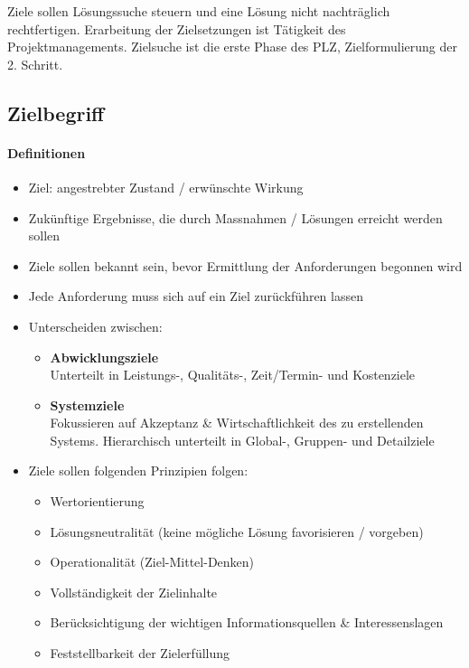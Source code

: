 \documentclass[a4paper]{article}
\begin{document}
			Ziele sollen Lösungssuche steuern und eine Lösung nicht nachträglich rechtfertigen.
			Erarbeitung der Zielsetzungen ist Tätigkeit des Projektmanagements.
			Zielsuche ist die erste Phase des PLZ, Zielformulierung der 2. Schritt.
			
		\subsection{Zielbegriff}
		
			\paragraph{Definitionen}
			
				\begin{itemize}
					\item Ziel: angestrebter Zustand / erwünschte Wirkung
					\item Zukünftige Ergebnisse, die durch Massnahmen / Lösungen erreicht werden sollen
					\item Ziele sollen bekannt sein, bevor Ermittlung der Anforderungen begonnen wird
					\item Jede Anforderung muss sich auf ein Ziel zurückführen lassen
					\item Unterscheiden zwischen:
						\begin{itemize}
							\item \textbf{Abwicklungsziele}\\
							Unterteilt in Leistungs-, Qualitäts-, Zeit/Termin- und Kostenziele
							\item \textbf{Systemziele}\\
							Fokussieren auf Akzeptanz \& Wirtschaftlichkeit des zu erstellenden Systems. Hierarchisch unterteilt in Global-, Gruppen- und Detailziele
						\end{itemize}
					\item Ziele sollen folgenden Prinzipien folgen:
						\begin{itemize}
							\item Wertorientierung
							\item Lösungsneutralität (keine mögliche Lösung favorisieren / vorgeben)
							\item Operationalität (Ziel-Mittel-Denken)
							\item Vollständigkeit der Zielinhalte
							\item Berücksichtigung der wichtigen Informationsquellen \& Interessenslagen
							\item Feststellbarkeit der Zielerfüllung

\end{itemize}
\end{itemize}
\end{document}
